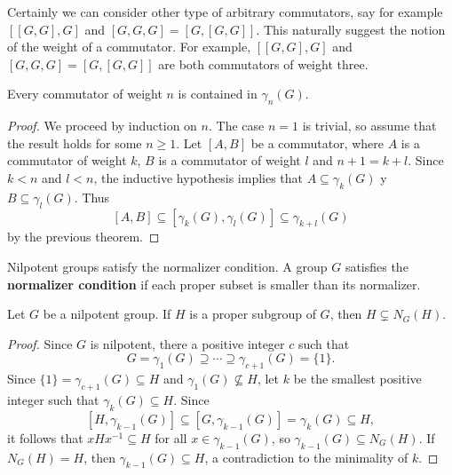 Certainly we can consider other type of arbitrary commutators, say for example 
$[[G,G],G]$ and $[G,G,G]=[G,[G,G]]$. This naturally suggest the notion of the
weight of a commutator. For example, $[[G,G],G]$ and $[G,G,G]=[G,[G,G]]$ are
both commutators of weight three. 

\begin{corollary}
	Every commutator of weight $n$ is contained in 
	$\gamma_n(G)$.
\end{corollary}

\begin{proof}
	We proceed by induction on $n$. The case $n=1$ is trivial, so assume that
	the result holds for some $n\geq1$.  Let  
	$[A,B]$ be a commutator, where $A$ is a commutator of weight $k$,
	$B$ is a commutator of weight $l$ and $n+1=k+l$. Since $k<n$ and $l<n$, the inductive 
	hypothesis implies that $A\subseteq \gamma_k(G)$ y $B\subseteq
	\gamma_l(G)$. Thus 
	\[
	[A,B]\subseteq [\gamma_k(G),\gamma_l(G)]\subseteq
	\gamma_{k+l}(G)
	\]
	by the previous theorem. 
\end{proof}

Nilpotent groups satisfy the normalizer condition. A group 
$G$ satisfies the \textbf{normalizer condition} if each proper subset is smaller 
than its normalizer. 

\begin{lemma}
	\label{lem:normalizer}
	Let $G$ be a nilpotent group. If $H$ is a proper subgroup of $G$, then 
	$H\subsetneq N_G(H)$.
\end{lemma}

\begin{proof}
	Since $G$ is nilpotent, there a positive integer $c$ such that 
	\[
	G=\gamma_1(G)\supseteq\cdots\supseteq\gamma_{c+1}(G)=\{1\}.
	\]
	Since 
	$\{1\}=\gamma_{c+1}(G)\subseteq H$ and $\gamma_1(G)\not\subseteq H$, 
	let $k$ be the smallest positive integer such that $\gamma_k(G)\subseteq H$. Since 
	\[
		[H,\gamma_{k-1}(G)]\subseteq [G,\gamma_{k-1}(G)]=\gamma_k(G)\subseteq H,
	\]
	it follows that 
	$xHx^{-1}\subseteq H$ for all $x\in\gamma_{k-1}(G)$,
	so  $\gamma_{k-1}(G)\subseteq N_G(H)$. If $N_G(H)=H$, then 
	$\gamma_{k-1}(G)\subseteq H$, a contradiction to the minimality of $k$. 
\end{proof}



